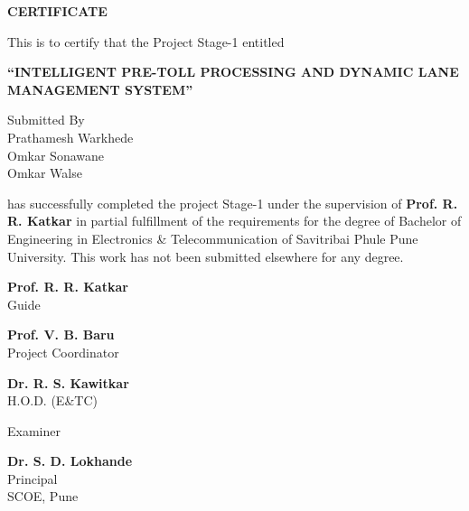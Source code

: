 \documentclass[12pt,a4paper]{report}
\newcommand{\ProjectTitle}{INTELLIGENT PRE-TOLL PROCESSING AND DYNAMIC LANE MANAGEMENT SYSTEM}
\newcommand{\StudentOne}{Prathamesh Warkhede}
\newcommand{\StudentTwo}{Omkar Sonawane}
\newcommand{\StudentThree}{Omkar Walse}
\newcommand{\GuideName}{Prof. R. R. Katkar}
\newcommand{\CoordinatorName}{Prof. V. B. Baru}
\newcommand{\HODName}{Dr. R. S. Kawitkar}
\newcommand{\PrincipalName}{Dr. S. D. Lokhande}
\begin{document}
\clearpage
\thispagestyle{empty}
\begin{center}
{\Large\bfseries CERTIFICATE\par}
\vspace{0.8cm}
This is to certify that the Project Stage-1 entitled\\[0.4cm]
{\Large\bfseries ``\ProjectTitle''\par}
\vspace{0.5cm}
Submitted By\\[0.4cm]
\StudentOne\\
\StudentTwo\\
\StudentThree
\end{center}

\vspace{0.5cm}
has successfully completed the project Stage-1 under the supervision of
\textbf{\GuideName} in partial fulfillment of the requirements for the degree of
Bachelor of Engineering in Electronics \& Telecommunication of Savitribai Phule
Pune University. This work has not been submitted elsewhere for any degree.

\vspace{1.8cm}
\noindent
\begin{minipage}[t]{0.30\textwidth}\centering
\textbf{\GuideName}\\Guide
\end{minipage}\hfill
\begin{minipage}[t]{0.30\textwidth}\centering
\textbf{\CoordinatorName}\\Project Coordinator
\end{minipage}\hfill
\begin{minipage}[t]{0.30\textwidth}\centering
\textbf{\HODName}\\H.O.D. (E\&TC)
\end{minipage}

\vspace{2cm}
\noindent
\begin{minipage}[t]{0.45\textwidth}\centering Examiner\end{minipage}\hfill
\begin{minipage}[t]{0.45\textwidth}\centering
\textbf{\PrincipalName}\\Principal\\SCOE, Pune
\end{minipage}
\end{document}
